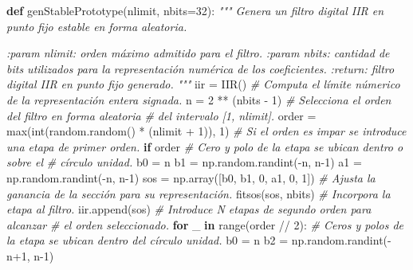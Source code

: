 \documentclass[11pt]{article}
\newenvironment{Shaded}{}{}
\newcommand{\KeywordTok}[1]{\textcolor[rgb]{0.00,0.44,0.13}{\textbf{{#1}}}}
\newcommand{\DecValTok}[1]{\textcolor[rgb]{0.25,0.63,0.44}{{#1}}}
\newcommand{\CommentTok}[1]{\textcolor[rgb]{0.38,0.63,0.69}{\textit{{#1}}}}
\newcommand{\NormalTok}[1]{{#1}}
\newcommand{\ControlFlowTok}[1]{\textcolor[rgb]{0.00,0.44,0.13}{\textbf{{#1}}}}
\newcommand{\OperatorTok}[1]{\textcolor[rgb]{0.40,0.40,0.40}{{#1}}}
\newcommand{\BuiltInTok}[1]{{#1}}
\begin{document}
\begin{Shaded}
\begin{Highlighting}[]
\KeywordTok{def}\NormalTok{ genStablePrototype(nlimit, nbits}\OperatorTok{=}\DecValTok{32}\NormalTok{):}
    \CommentTok{"""}
\CommentTok{    Genera un filtro digital IIR en punto fijo estable en}
\CommentTok{    forma aleatoria.}

\CommentTok{    :param nlimit: orden máximo admitido para el filtro.}
\CommentTok{    :param nbits: cantidad de bits utilizados para la}
\CommentTok{      representación numérica de los coeficientes.}
\CommentTok{    :return: filtro digital IIR en punto fijo generado.}
\CommentTok{    """}
\NormalTok{    iir }\OperatorTok{=}\NormalTok{ IIR()}
    \CommentTok{# Computa el límite númerico de la representación entera signada.}
\NormalTok{    n }\OperatorTok{=} \DecValTok{2} \OperatorTok{**}\NormalTok{ (nbits }\OperatorTok{-} \DecValTok{1}\NormalTok{)}
    \CommentTok{# Selecciona el orden del filtro en forma aleatoria}
    \CommentTok{# del intervalo [1, nlimit].}
\NormalTok{    order }\OperatorTok{=} \BuiltInTok{max}\NormalTok{(}\BuiltInTok{int}\NormalTok{(random.random() }\OperatorTok{*}\NormalTok{ (nlimit }\OperatorTok{+} \DecValTok{1}\NormalTok{)), }\DecValTok{1}\NormalTok{)}
    \CommentTok{# Si el orden es impar se introduce una etapa de primer orden.}
    \ControlFlowTok{if}\NormalTok{ order }\OperatorTok{%} \DecValTok{2} \OperatorTok{!=} \DecValTok{0}\NormalTok{:}
        \CommentTok{# Cero y polo de la etapa se ubican dentro o sobre el}
        \CommentTok{# círculo unidad.}
\NormalTok{        b0 }\OperatorTok{=}\NormalTok{ n}
\NormalTok{        b1 }\OperatorTok{=}\NormalTok{ np.random.randint(}\OperatorTok{-}\NormalTok{n, n}\DecValTok{-1}\NormalTok{)}
\NormalTok{        a1 }\OperatorTok{=}\NormalTok{ np.random.randint(}\OperatorTok{-}\NormalTok{n, n}\DecValTok{-1}\NormalTok{)}
\NormalTok{        sos }\OperatorTok{=}\NormalTok{ np.array([b0, b1, }\DecValTok{0}\NormalTok{, a1, }\DecValTok{0}\NormalTok{, }\DecValTok{1}\NormalTok{])}
        \CommentTok{# Ajusta la ganancia de la sección para su representación.}
\NormalTok{        fitsos(sos, nbits)}
        \CommentTok{# Incorpora la etapa al filtro.}
\NormalTok{        iir.append(sos)}
    \CommentTok{# Introduce N etapas de segundo orden para alcanzar}
    \CommentTok{# el orden seleccionado.}
    \ControlFlowTok{for}\NormalTok{ _ }\KeywordTok{in} \BuiltInTok{range}\NormalTok{(order }\OperatorTok{//} \DecValTok{2}\NormalTok{):}
        \CommentTok{# Ceros y polos de la etapa se ubican dentro del círculo unidad.}
\NormalTok{        b0 }\OperatorTok{=}\NormalTok{ n}
\NormalTok{        b2 }\OperatorTok{=}\NormalTok{ np.random.randint(}\OperatorTok{-}\NormalTok{n}\OperatorTok{+}\DecValTok{1}\NormalTok{, n}\DecValTok{-1}\NormalTok{)}
}
\end{Highlighting}
\end{Shaded}
\end{document}
